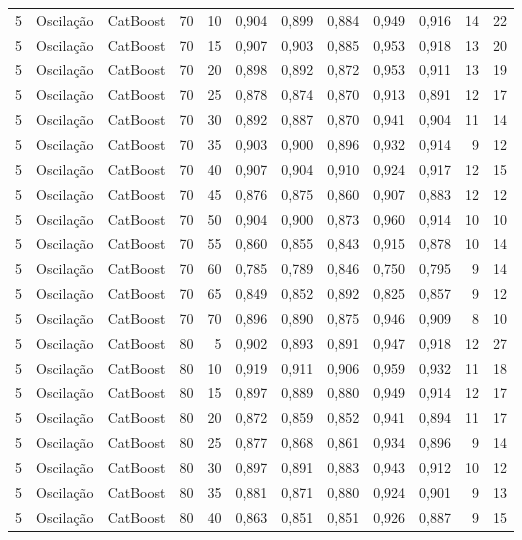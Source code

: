 \begin{longtable}{@{}rllrrrrrrrrr@{}}
5 & Oscilação & CatBoost & 70 & 10 & 0,904 & 0,899 & 0,884 & 0,949 & 0,916 & 14 & 22 \\
5 & Oscilação & CatBoost & 70 & 15 & 0,907 & 0,903 & 0,885 & 0,953 & 0,918 & 13 & 20 \\
5 & Oscilação & CatBoost & 70 & 20 & 0,898 & 0,892 & 0,872 & 0,953 & 0,911 & 13 & 19 \\
5 & Oscilação & CatBoost & 70 & 25 & 0,878 & 0,874 & 0,870 & 0,913 & 0,891 & 12 & 17 \\
5 & Oscilação & CatBoost & 70 & 30 & 0,892 & 0,887 & 0,870 & 0,941 & 0,904 & 11 & 14 \\
5 & Oscilação & CatBoost & 70 & 35 & 0,903 & 0,900 & 0,896 & 0,932 & 0,914 & 9 & 12 \\
5 & Oscilação & CatBoost & 70 & 40 & 0,907 & 0,904 & 0,910 & 0,924 & 0,917 & 12 & 15 \\
5 & Oscilação & CatBoost & 70 & 45 & 0,876 & 0,875 & 0,860 & 0,907 & 0,883 & 12 & 12 \\
5 & Oscilação & CatBoost & 70 & 50 & 0,904 & 0,900 & 0,873 & 0,960 & 0,914 & 10 & 10 \\
5 & Oscilação & CatBoost & 70 & 55 & 0,860 & 0,855 & 0,843 & 0,915 & 0,878 & 10 & 14 \\
5 & Oscilação & CatBoost & 70 & 60 & 0,785 & 0,789 & 0,846 & 0,750 & 0,795 & 9 & 14 \\
5 & Oscilação & CatBoost & 70 & 65 & 0,849 & 0,852 & 0,892 & 0,825 & 0,857 & 9 & 12 \\
5 & Oscilação & CatBoost & 70 & 70 & 0,896 & 0,890 & 0,875 & 0,946 & 0,909 & 8 & 10 \\
5 & Oscilação & CatBoost & 80 & 5 & 0,902 & 0,893 & 0,891 & 0,947 & 0,918 & 12 & 27 \\
5 & Oscilação & CatBoost & 80 & 10 & 0,919 & 0,911 & 0,906 & 0,959 & 0,932 & 11 & 18 \\
5 & Oscilação & CatBoost & 80 & 15 & 0,897 & 0,889 & 0,880 & 0,949 & 0,914 & 12 & 17 \\
5 & Oscilação & CatBoost & 80 & 20 & 0,872 & 0,859 & 0,852 & 0,941 & 0,894 & 11 & 17 \\
5 & Oscilação & CatBoost & 80 & 25 & 0,877 & 0,868 & 0,861 & 0,934 & 0,896 & 9 & 14 \\
5 & Oscilação & CatBoost & 80 & 30 & 0,897 & 0,891 & 0,883 & 0,943 & 0,912 & 10 & 12 \\
5 & Oscilação & CatBoost & 80 & 35 & 0,881 & 0,871 & 0,880 & 0,924 & 0,901 & 9 & 13 \\
5 & Oscilação & CatBoost & 80 & 40 & 0,863 & 0,851 & 0,851 & 0,926 & 0,887 & 9 & 15 \\

\end{longtable}
